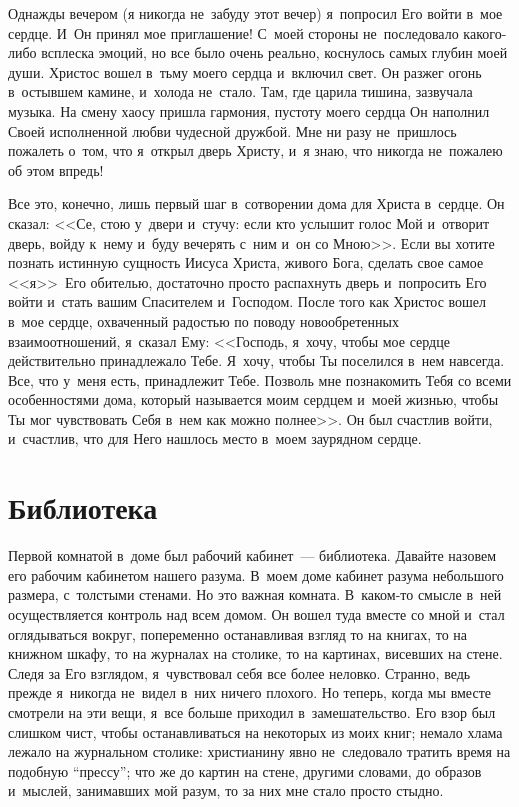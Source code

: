 \documentclass[12pt,article,a4paper,fittopage]{ncc}
\begin{document}
\begin{multicols}{2}
Однажды вечером (я никогда не~забуду этот вечер) я~попросил Его войти в~мое сердце. И~Он принял мое приглашение! С~моей стороны не~последовало какого-либо всплеска эмоций, но все было очень реально, коснулось самых глубин моей души. Христос вошел в~тьму моего сердца и~включил свет. Он разжег огонь в~остывшем камине, и~холода не~стало. Там, где царила тишина, зазвучала музыка. На смену хаосу пришла гармония, пустоту моего сердца Он наполнил Своей исполненной любви чудесной дружбой. Мне ни разу не~пришлось пожалеть о~том, что я~открыл дверь Христу, и~я знаю, что никогда не~пожалею об этом впредь!

Все это, конечно, лишь первый шаг в~сотворении дома для Христа в~сердце. Он сказал: <<Се, стою у~двери и~стучу: если кто услышит голос Мой и~отворит дверь, войду к~нему и~буду вечерять с~ним и~он со Мною>>. Если вы хотите познать истинную сущность Иисуса Христа, живого Бога, сделать свое самое <<я>>~Его обителью, достаточно просто распахнуть дверь и~попросить Его войти и~стать вашим Спасителем и~Господом. После того как Христос вошел в~мое сердце, охваченный радостью по поводу новообретенных взаимоотношений, я~сказал Ему: <<Господь, я~хочу, чтобы мое сердце действительно принадлежало Тебе. Я~хочу, чтобы Ты поселился в~нем навсегда. Все, что у~меня есть, принадлежит Тебе. Позволь мне познакомить Тебя со всеми особенностями дома, который называется моим сердцем и~моей жизнью, чтобы Ты мог чувствовать Себя в~нем как можно полнее>>. Он был счастлив войти, и~счастлив, что для Него нашлось место в~моем заурядном сердце.

\pagestyle{lheadings}

\section*{Библиотека}

Первой комнатой в~доме был рабочий кабинет~--- библиотека. Давайте назовем его рабочим кабинетом нашего разума. В~моем доме кабинет разума небольшого размера, с~толстыми стенами. Но это важная комната. В~каком-то смысле в~ней осуществляется контроль над всем домом. Он вошел туда вместе со мной и~стал оглядываться вокруг, попеременно останавливая взгляд то на книгах, то на книжном шкафу, то на журналах на столике, то на картинах, висевших на стене. Следя за Его взглядом, я~чувствовал себя все более неловко. Странно, ведь прежде я~никогда не~видел в~них ничего плохого. Но теперь, когда мы вместе смотрели на эти вещи, я~все больше приходил в~замешательство. Его взор был слишком чист, чтобы останавливаться на некоторых из моих книг; немало хлама лежало на журнальном столике: христианину явно не~следовало тратить время на подобную “прессу”; что же до картин на стене, другими словами, до образов и~мыслей, занимавших мой разум, то за них мне стало просто стыдно.


\end{multicols}
\end{document}
